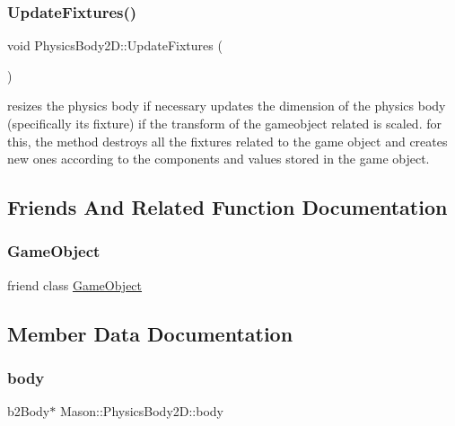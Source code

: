\subsubsection{\texorpdfstring{Update\+Fixtures()}{UpdateFixtures()}}
{\footnotesize\ttfamily void Physics\+Body2\+D\+::\+Update\+Fixtures (\begin{DoxyParamCaption}{ }\end{DoxyParamCaption})}



resizes the physics body if necessary updates the dimension of the physics body (specifically its fixture) if the transform of the gameobject related is scaled. for this, the method destroys all the fixtures related to the game object and creates new ones according to the components and values stored in the game object. 



\subsection{Friends And Related Function Documentation}
\hypertarget{class_mason_1_1_physics_body2_d_a00df87c957d8f7ee0fc51f07a0542f4a}{}\label{class_mason_1_1_physics_body2_d_a00df87c957d8f7ee0fc51f07a0542f4a} 
\subsubsection{\texorpdfstring{Game\+Object}{GameObject}}
{\footnotesize\ttfamily friend class \hyperlink{class_mason_1_1_game_object}{Game\+Object}\hspace{0.3cm}{\ttfamily [friend]}}



\subsection{Member Data Documentation}
\hypertarget{class_mason_1_1_physics_body2_d_abd02e269a86d5b760966a33eefa918d9}{}\label{class_mason_1_1_physics_body2_d_abd02e269a86d5b760966a33eefa918d9} 
\subsubsection{\texorpdfstring{body}{body}}
{\footnotesize\ttfamily b2\+Body$\ast$ Mason\+::\+Physics\+Body2\+D\+::body}



